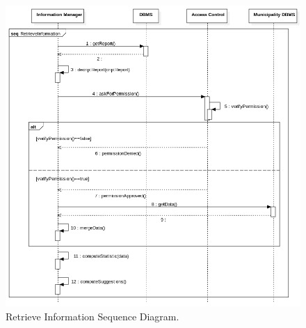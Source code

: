 \documentclass{report}
\begin{document}
\begin{figure}[ht!]
\begin{center}
\includegraphics[width=\textwidth]{./img/RetrieveSdd.png}
\end{center}
\caption{Retrieve Information Sequence Diagram.}
\label{fig:SequenceDiagram4}
\end{figure}

\newpage 
\end{document}
